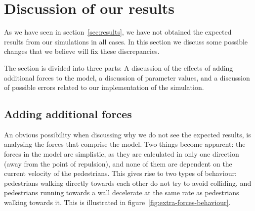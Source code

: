 \section{Discussion of our results}
\label{sec:discussion}
As we have seen in section~\ref{sec:results}, we have not obtained the 
expected results from our simulations in all cases. In this section we discuss 
some possible changes that we believe will fix these discrepancies.

The section is divided into three parts: A discussion of the effects of adding 
additional forces to the model, a discussion of parameter values, and a 
discussion of possible errors related to our implementation of the simulation.

\subsection{Adding additional forces}
An obvious possibility when discussing why we do not see the expected results, 
is analysing the forces that comprise the model. Two things become apparent: 
the forces in the model are simplistic, as they are calculated in only one 
direction (away from the point of repulsion), and none of them are dependent 
on the current velocity of the pedestrians. This gives rise to two types of 
behaviour: pedestrians walking directly towards each other do not try to avoid 
colliding, and pedestrians running towards a wall decelerate at the same rate 
as pedestrians walking towards it. This is illustrated in 
figure~\ref{fig:extra-forces-behaviour}.

